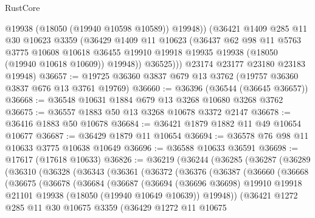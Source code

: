 \begin{lexlean}{RustCore}
\begin{coremodule}
              @19938
              (@18050 (@19940 @10598 @10589))
              @19948))
          (@36421
            @1409
            @285
            @11
            @30
            @10623
            @3359
            (@36429
              @1409
              @11
              @10623
              (@36437
                @62
                @98
                @11
                @5763
                @3775
                @10608
                @10618
                @36455
                @19910
                @19918
                @19935
                @19938
                (@18050 (@19940 @10618 @10609))
                @19948))
            @36525)))
      @23174
      @23177
      @23180
      @23183
      @19948)
@36657 := @19725 @36360 @3837 @679 @13 @3762 (@19757 @36360 @3837 @676 @13 @3761 @19769)
@36660 := @36396 (@36544 (@36645 @36657))
@36668 := @36548 @10631 @1884 @679 @13 @3268 @10680 @3268 @3762
@36675 := @36557 @1883 @50 @13 @3268 @10678 @3372 @2147
@36678 := @36416 @1883 @50 @10678
@36684 := @36421 @1879 @1882 @11 @49 @10654 @10677
@36687 := @36429 @1879 @11 @10654
@36694 := @36578 @76 @98 @11 @10633 @3775 @10638 @10649
@36696 := @36588 @10633 @36591
@36698 := @17617 (@17618 @10633)
@36826 := @36219
    (@36244
      (@36285
        (@36287
          (@36289
            (@36310
              (@36328
                (@36343
                  (@36361
                    (@36372
                      (@36376
                        (@36387
                          (@36660
                            (@36668
                              (@36675
                                (@36678
                                  (@36684
                                    (@36687
                                      (@36694
                                        (@36696 @36698)
                                        @19910
                                        @19918
                                        @21101
                                        @19938
                                        (@18050 (@19940 @10649 @10639))
                                        @19948))
                                    (@36421
                                      @1272
                                      @285
                                      @11
                                      @30
                                      @10675
                                      @3359
                                      (@36429
                                        @1272
                                        @11
                                        @10675

\end{coremodule}
\end{lexlean}
